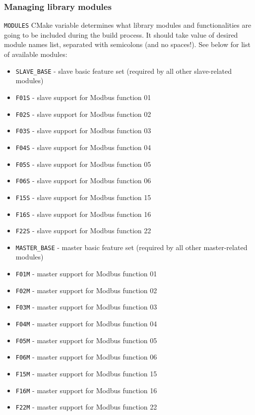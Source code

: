 \documentclass[11pt,a4paper]{article}
\begin{document}
\subsubsection{Managing library modules}
\texttt{MODULES} CMake variable determines what library modules and functionalities are going to be included during the build process. It should take value of desired module names list, separated with semicolons (and no spaces!). See below for list of available modules:

\begin{itemize}
	\setlength\itemsep{0em}
	\item\texttt{SLAVE\_BASE} - slave basic feature set (required by all other slave-related modules)
	\item\texttt{F01S} - slave support for Modbus function 01
	\item\texttt{F02S} - slave support for Modbus function 02
	\item\texttt{F03S} - slave support for Modbus function 03
	\item\texttt{F04S} - slave support for Modbus function 04
	\item\texttt{F05S} - slave support for Modbus function 05
	\item\texttt{F06S} - slave support for Modbus function 06
	\item\texttt{F15S} - slave support for Modbus function 15
	\item\texttt{F16S} - slave support for Modbus function 16
	\item\texttt{F22S} - slave support for Modbus function 22
	
	\item\texttt{MASTER\_BASE} - master basic feature set (required by all other master-related modules)
	\item\texttt{F01M} - master support for Modbus function 01
	\item\texttt{F02M} - master support for Modbus function 02
	\item\texttt{F03M} - master support for Modbus function 03
	\item\texttt{F04M} - master support for Modbus function 04
	\item\texttt{F05M} - master support for Modbus function 05
	\item\texttt{F06M} - master support for Modbus function 06
	\item\texttt{F15M} - master support for Modbus function 15
	\item\texttt{F16M} - master support for Modbus function 16
	\item\texttt{F22M} - master support for Modbus function 22
	

\end{itemize}
\end{document}
